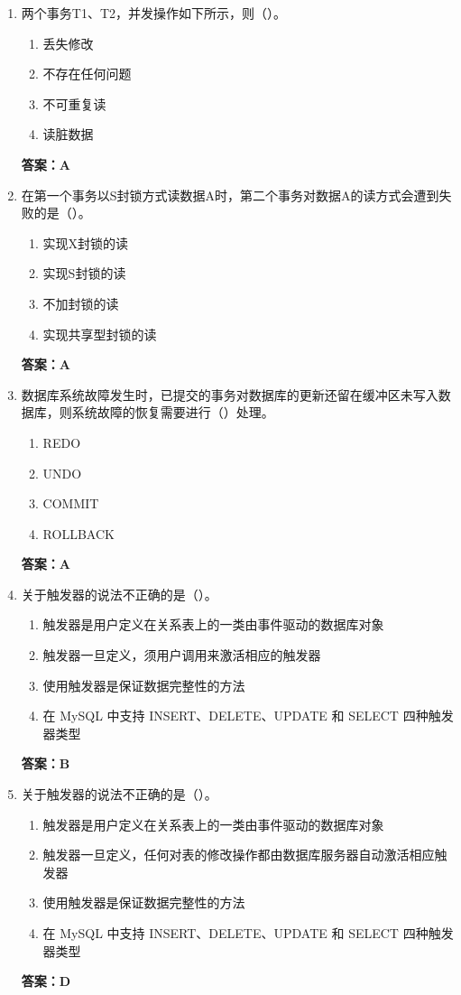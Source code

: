 \documentclass[12pt, a4paper]{article}
\begin{document}
\begin{enumerate}[label=\arabic*.]
	\item 两个事务T1、T2，并发操作如下所示，则（\quad）。
	      \begin{enumerate}
		      \item 丢失修改
		      \item 不存在任何问题
		      \item 不可重复读
		      \item 读脏数据
	      \end{enumerate}
	      \textbf{答案：A}

	\item 在第一个事务以S封锁方式读数据A时，第二个事务对数据A的读方式会遭到失败的是（\quad）。
	      \begin{enumerate}
		      \item 实现X封锁的读
		      \item 实现S封锁的读
		      \item 不加封锁的读
		      \item 实现共享型封锁的读
	      \end{enumerate}
	      \textbf{答案：A}

	\item 数据库系统故障发生时，已提交的事务对数据库的更新还留在缓冲区未写入数据库，则系统故障的恢复需要进行（\quad）处理。
	      \begin{enumerate}
		      \item REDO
		      \item UNDO
		      \item COMMIT
		      \item ROLLBACK
	      \end{enumerate}
	      \textbf{答案：A}

	\item 关于触发器的说法不正确的是（\quad）。
	      \begin{enumerate}
		      \item 触发器是用户定义在关系表上的一类由事件驱动的数据库对象
		      \item 触发器一旦定义，须用户调用来激活相应的触发器
		      \item 使用触发器是保证数据完整性的方法
		      \item 在 MySQL 中支持 INSERT、DELETE、UPDATE 和 SELECT 四种触发器类型
	      \end{enumerate}
	      \textbf{答案：B}

	\item 关于触发器的说法不正确的是（\quad）。
	      \begin{enumerate}
		      \item 触发器是用户定义在关系表上的一类由事件驱动的数据库对象
		      \item 触发器一旦定义，任何对表的修改操作都由数据库服务器自动激活相应触发器
		      \item 使用触发器是保证数据完整性的方法
		      \item 在 MySQL 中支持 INSERT、DELETE、UPDATE 和 SELECT 四种触发器类型
	      \end{enumerate}
	      \textbf{答案：D}


\end{enumerate}
\end{document}
